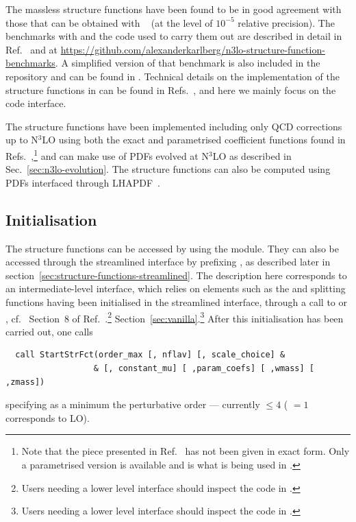 The massless structure functions have been found to be in good
agreement with those that can be obtained with
\APFELPP{}~\cite{Bertone:2013vaa,Bertone:2017gds} (at the level of
$10^{-5}$ relative precision).
%
The benchmarks with \APFELPP{} and the code used to carry them out are
described in detail in Ref.~\cite{Bertone:2024dpm} and at
\url{https://github.com/alexanderkarlberg/n3lo-structure-function-benchmarks}. A
simplified version of that benchmark is also included in the \hoppet
repository and can be found in
.
%
Technical details on the implementation of the structure functions in
\hoppet can be found in
Refs.~\cite{Dreyer:2016vbc,Karlberg:2016zik,Bertone:2024dpm}, and here
we mainly focus on the code interface.

The structure functions have been implemented including only QCD
corrections up to N$^3$LO using both the exact and parametrised
coefficient functions found in
Refs.~\cite{vanNeerven:1999ca,vanNeerven:2000uj,Moch:2004xu,Vermaseren:2005qc,Moch:2008fj,Davies:2016ruz,Blumlein:2022gpp},\footnote{Note
that the piece presented in Ref.~\cite{Davies:2016ruz} has not been
given in exact form. Only a parametrised version is available and
is what is being used in \hoppet.}  and can make use of PDFs evolved
at N$^3$LO as described in Sec.~\ref{sec:n3lo-evolution}. The
structure functions can also be computed using PDFs interfaced through
LHAPDF~\cite{LHAPDF}.

\subsection{Initialisation}
\label{sec:structure-funcs-init}

The structure functions can be accessed by using the
 module.
%
They can also be accessed through the
streamlined interface by prefixing , as described
later in section~\ref{sec:structure-functions-streamlined}.
%
The description here corresponds to an intermediate-level interface, which
relies on elements such as the  and splitting functions
having been initialised in the streamlined interface, through a call
to  or , cf.\
%
\ifreleasenote
Section~8 of Ref.~\cite{Salam:2008qg}.\footnote{Users needing a lower level
  interface should inspect the code in .}
\else
Section~\ref{sec:vanilla}.\footnote{Users needing a lower level
  interface should inspect the code in .}
\fi
%
After this initialisation has been carried out, one calls
\begin{lstlisting}
  call StartStrFct(order_max [, nflav] [, scale_choice] &
                  & [, constant_mu] [ ,param_coefs] [ ,wmass] [ ,zmass])
\end{lstlisting}
specifying as a minimum the perturbative order --- currently
 $ \le 4$ (\ttt{order\_max} $ =1$ corresponds to LO).

